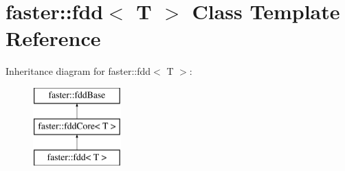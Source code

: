 \hypertarget{classfaster_1_1fdd}{}\section{faster\+:\+:fdd$<$ T $>$ Class Template Reference}
\label{classfaster_1_1fdd}
Inheritance diagram for faster\+:\+:fdd$<$ T $>$\+:\begin{figure}[H]
\begin{center}
\leavevmode
\includegraphics[height=3.000000cm]{classfaster_1_1fdd}
\end{center}
\end{figure}
